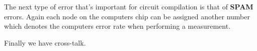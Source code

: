 The next type of error that's important for circuit compilation is that of \textbf{\ac{SPAM}} errors. %
Again each node on the computers chip can be assigned another number which denotes the computers error rate when performing a measurement.

Finally we have cross-talk.
